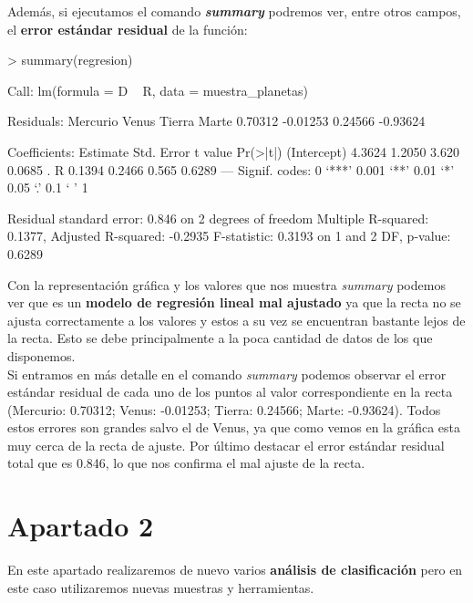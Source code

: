 \documentclass [a4paper] {article}
\begin{document}
Además, si ejecutamos el comando \textbf{\textit{summary}} podremos ver, entre otros campos, el \textbf{error estándar residual} de la función:
\begin{Schunk}
\begin{Sinput}
> summary(regresion)
\end{Sinput}
\begin{Soutput}
Call:
lm(formula = D ~ R, data = muestra_planetas)

Residuals:
Mercurio    Venus   Tierra    Marte 
 0.70312 -0.01253  0.24566 -0.93624 

Coefficients:
            Estimate Std. Error t value Pr(>|t|)  
(Intercept)   4.3624     1.2050   3.620   0.0685 .
R             0.1394     0.2466   0.565   0.6289  
---
Signif. codes:  0 ‘***’ 0.001 ‘**’ 0.01 ‘*’ 0.05 ‘.’ 0.1 ‘ ’ 1

Residual standard error: 0.846 on 2 degrees of freedom
Multiple R-squared:  0.1377,	Adjusted R-squared:  -0.2935 
F-statistic: 0.3193 on 1 and 2 DF,  p-value: 0.6289
\end{Soutput}
\end{Schunk}
Con la representación gráfica y los valores que nos muestra \textit{summary} podemos ver que es un \textbf{modelo de regresión lineal mal ajustado} 
ya que la recta no se ajusta correctamente a los valores y estos a su vez se encuentran bastante lejos de la recta. Esto se debe principalmente a 
la poca cantidad de datos de los que disponemos. \\
Si entramos en más detalle en el comando \textit{summary} podemos observar el error estándar residual de cada uno de los puntos al valor correspondiente
en la recta (Mercurio: 0.70312; Venus: -0.01253; Tierra: 0.24566; Marte: -0.93624). Todos estos errores son grandes salvo el de Venus, ya que como 
vemos en la gráfica esta muy cerca de la recta de ajuste. Por último destacar el error estándar residual total que es 0.846, lo que nos confirma el mal
ajuste de la recta.

\newpage
\section{Apartado 2}
En este apartado realizaremos de nuevo varios \textbf{análisis de clasificación} pero en este caso utilizaremos nuevas muestras y herramientas.
\end{document}
